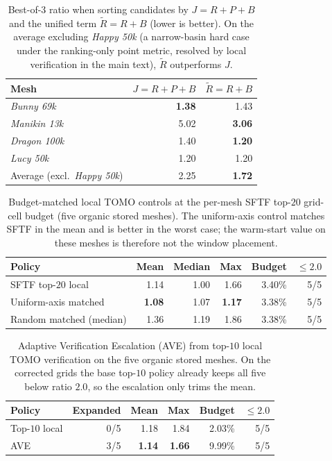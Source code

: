 \documentclass[11pt,a4paper]{article}
\begin{document}
\begin{table}[H]
\centering
\caption{Best-of-3 ratio when sorting candidates by $J=R+P+B$ and the unified term $\tilde R=R+B$ (lower is better).
On the average excluding \emph{Happy 50k} (a narrow-basin hard case under the ranking-only point metric, resolved by local
verification in the main text), $\tilde R$ outperforms $J$.}
\label{stab:unified-b3}
\begin{tabular}{lrr}
\toprule
Mesh & $J=R{+}P{+}B$ & $\tilde R=R{+}B$\\
\midrule
\emph{Bunny 69k}   & \textbf{1.38} & 1.43\\
\emph{Manikin 13k} & 5.02 & \textbf{3.06}\\
\emph{Dragon 100k}  & 1.40 & \textbf{1.20}\\
\emph{Lucy 50k}    & 1.20 & 1.20\\
\midrule
Average (excl.\ \emph{Happy 50k}) & 2.25 & \textbf{1.72}\\
\bottomrule
\end{tabular}
\end{table}



\begin{table}[H]
\centering
\caption{Budget-matched local TOMO controls at the per-mesh SFTF top-$20$ grid-cell budget (five organic stored meshes).
The uniform-axis control matches SFTF in the mean and is better in the worst case; the warm-start value on these meshes is therefore not the window placement.}
\label{stab:budget-matched-baseline}
\small
\begin{tabular}{lrrrrr}
\toprule
Policy & Mean & Median & Max & Budget & $\le 2.0$\\
\midrule
SFTF top-$20$ local & 1.14 & 1.00 & 1.66 & 3.40\% & 5/5\\
Uniform-axis matched & \textbf{1.08} & 1.07 & \textbf{1.17} & 3.38\% & 5/5\\
Random matched (median) & 1.36 & 1.19 & 1.86 & 3.38\% & 5/5\\
\bottomrule
\end{tabular}
\end{table}

\begin{table}[H]
\centering
\caption{Adaptive Verification Escalation (AVE) from top-$10$ local TOMO verification on the five organic stored meshes.
On the corrected grids the base top-$10$ policy already keeps all five below ratio $2.0$, so the escalation only trims the mean.}
\label{stab:ave-organic}
\small
\begin{tabular}{lrrrrr}
\toprule
Policy & Expanded & Mean & Max & Budget & $\le 2.0$\\
\midrule
Top-$10$ local & 0/5 & 1.18 & 1.84 & 2.03\% & 5/5\\
AVE & 3/5 & \textbf{1.14} & \textbf{1.66} & 9.99\% & 5/5\\
\bottomrule
\end{tabular}
\end{table}
\end{document}
